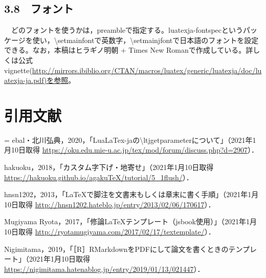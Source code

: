 \documentclass[
  a4paper]{ltjsarticle}
\newenvironment{hangall}[1]{\hangindent = #1\zw\everypar{\hangindent = #1\zw}}{}
\begin{document}
\hypertarget{ux30d5ux30a9ux30f3ux30c8}{%
\subsection{3.8　フォント}\label{ux30d5ux30a9ux30f3ux30c8}}

　どのフォントを使うかは，preambleで指定する。luatexja-fontspecというパッケージを使い，\textbackslash setmainfontで英数字，\textbackslash setmainjfontで日本語のフォントを設定できる。なお，本稿はヒラギノ明朝
+ Times New
Romanで作成している。詳しくは公式vignette(\url{http://mirrors.ibiblio.org/CTAN/macros/luatex/generic/luatexja/doc/luatexja-ja.pdf)を参照}。
　

\theendnotes

\clearpage

\setcounter{page}{1}

\hypertarget{ux5f15ux7528ux6587ux732e}{%
\section{引用文献}\label{ux5f15ux7528ux6587ux732e}}

\begin{hangall}{2}  

ebal・北川弘典，2020，「LuaLaTex-jaの\textbackslash ltjgetparameterについて」（2021年1月10日取得
\url{https://oku.edu.mie-u.ac.jp/tex/mod/forum/discuss.php?d=2907}）．

hakuoku，2018，「カスタム字下げ・地寄せ」（2021年1月10日取得
\url{https://hakuoku.github.io/agakuTeX/tutorial/5_1flush/}）．

hnsn1202，2013，「LaTeXで脚注を文書末もしくは章末に書く手順」（2021年1月10日取得
\url{http://hnsn1202.hateblo.jp/entry/2013/02/06/170617}）．

Mugiyama
Ryota，2017，「修論LaTeXテンプレート（jsbook使用）」（2021年1月10日取得
\url{http://ryotamugiyama.com/2017/02/17/textemplate/}）．

Nigimitama，2019，「［R］RMarkdownをPDFにして論文を書くときのテンプレート」（2021年1月10日取得
\url{https://nigimitama.hatenablog.jp/entry/2019/01/13/021447}）．

\end{hangall}  
\end{document}
